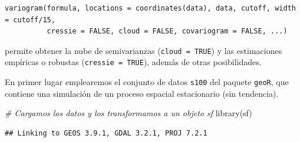 \documentclass[
  spanish,
]{book}
\newenvironment{Shaded}{\begin{snugshade}}{\end{snugshade}}
\newcommand{\AttributeTok}[1]{\textcolor[rgb]{0.77,0.63,0.00}{#1}}
\newcommand{\CommentTok}[1]{\textcolor[rgb]{0.56,0.35,0.01}{\textit{#1}}}
\newcommand{\ConstantTok}[1]{\textcolor[rgb]{0.00,0.00,0.00}{#1}}
\newcommand{\DecValTok}[1]{\textcolor[rgb]{0.00,0.00,0.81}{#1}}
\newcommand{\FloatTok}[1]{\textcolor[rgb]{0.00,0.00,0.81}{#1}}
\newcommand{\FunctionTok}[1]{\textcolor[rgb]{0.00,0.00,0.00}{#1}}
\newcommand{\NormalTok}[1]{#1}
\newcommand{\OtherTok}[1]{\textcolor[rgb]{0.56,0.35,0.01}{#1}}
\newcommand{\SpecialCharTok}[1]{\textcolor[rgb]{0.00,0.00,0.00}{#1}}
\newcommand{\StringTok}[1]{\textcolor[rgb]{0.31,0.60,0.02}{#1}}
\theoremstyle{break}
\theoremstyle{definition}
\theoremstyle{definition}
\theoremstyle{definition}
\theoremstyle{definition}
\theoremstyle{remark}
\begin{document}
\begin{verbatim}
variogram(formula, locations = coordinates(data), data, cutoff, width = cutoff/15,
          cressie = FALSE, cloud = FALSE, covariogram = FALSE, ...)
\end{verbatim}

permite obtener la nube de semivarianzas (\texttt{cloud\ =\ TRUE}) y las estimaciones
empíricas o robustas (\texttt{cressie\ =\ TRUE}), además de otras posibilidades.

En primer lugar emplearemos el conjunto de datos \texttt{s100} del paquete \texttt{geoR}, que contiene una simulación de un proceso espacial estacionario (sin tendencia).

\begin{Shaded}
\begin{Highlighting}[]
\CommentTok{\# Cargamos los datos y los transformamos a un objeto \textasciigrave{}sf\textasciigrave{}}
\FunctionTok{library}\NormalTok{(sf)}
\end{Highlighting}
\end{Shaded}

\begin{verbatim}
## Linking to GEOS 3.9.1, GDAL 3.2.1, PROJ 7.2.1
\end{verbatim}

\begin{Shaded}
\end{Shaded}

\begin{Shaded}
\end{Shaded}
\end{document}
